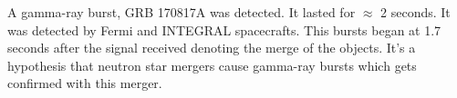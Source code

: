 A gamma-ray burst, GRB 170817A was detected. It lasted for $\approx$ 2 seconds. It was detected by Fermi and INTEGRAL spacecrafts. This bursts began at 1.7 seconds after the signal received denoting the merge of the objects. It's a hypothesis that neutron star mergers cause gamma-ray bursts which gets confirmed with this merger.















































































\pagebreak
